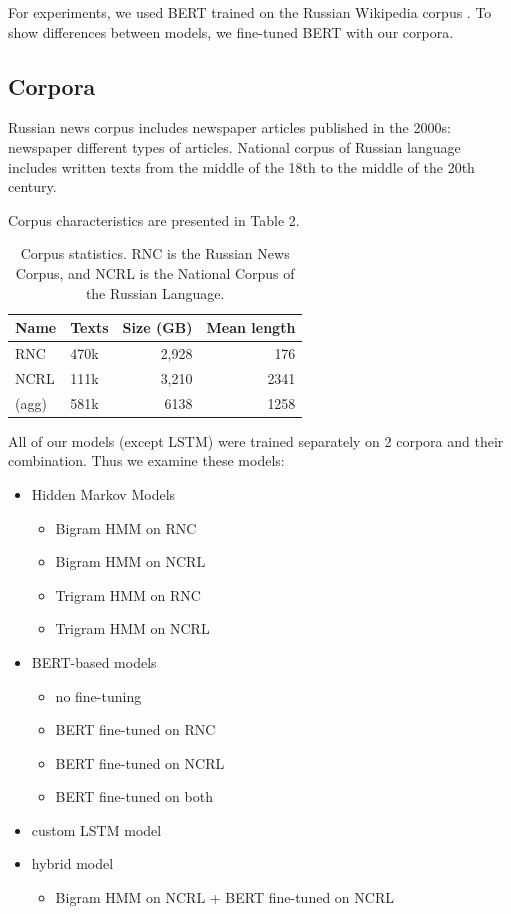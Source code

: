 \documentclass[a4paper]{article}
\begin{document}
For experiments, we used BERT trained on the Russian Wikipedia corpus
\cite{ruwiki}. To show differences between models, we fine-tuned BERT with our corpora.


\subsection{Corpora}

Russian news corpus \cite{runews} includes newspaper articles published in the 2000s: newspaper different types of articles.
National corpus of Russian language \cite{natcorp} includes written texts from the middle of the 18th to the middle of the 20th century.

Corpus characteristics are presented in Table 2.

\begin{table}
\caption{Corpus statistics. RNC is the Russian News Corpus, and NCRL is the National Corpus of the Russian Language.
\newline}
\centering

\begin{tabular}{llrr}
\textbf{Name}&
\textbf{Texts} &
\textbf{Size} (GB)&
\textbf{Mean length}\\
\hline
RNC &
470k&
2,928&
176\\
NCRL &
111k &
3,210 &
2341 \\
(agg) &
581k &
6138 &
1258
\end{tabular}
\end{table}


All of our models (except LSTM) were trained separately on 2 corpora and their combination. Thus we examine these models:

\begin{itemize}
	\item Hidden Markov Models
	\begin{itemize}
		\item Bigram HMM on RNC
		\item Bigram HMM on NCRL
		\item Trigram HMM on RNC
		\item Trigram HMM on NCRL
	\end{itemize}
	\item BERT-based models

	\begin{itemize}
		\item no fine-tuning
		\item BERT fine-tuned on RNC
		\item BERT fine-tuned on NCRL
		\item BERT fine-tuned on both
	\end{itemize}

	\item custom LSTM model
	\item hybrid model
	\begin{itemize}
		\item Bigram HMM on NCRL + BERT fine-tuned on NCRL
	\end{itemize}
\end{itemize}
\end{document}
